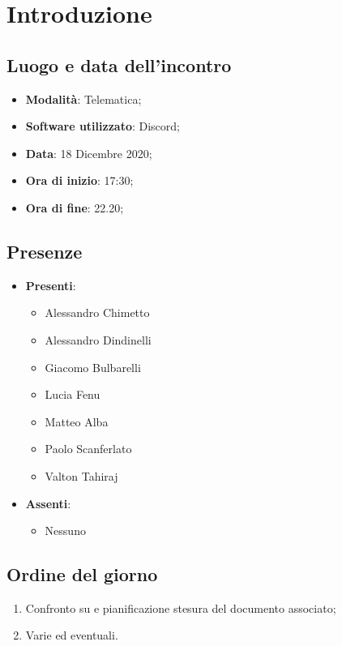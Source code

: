 \documentclass[]{article}
\begin{document}
	
	
	
	\newpage
	
	\section{Introduzione}
		\subsection{Luogo e data dell'incontro}
		\begin{itemize}
			\item \textbf{Modalità}: Telematica;
			\item \textbf{Software utilizzato}: Discord;
			\item \textbf{Data}: 18 Dicembre 2020;
			\item \textbf{Ora di inizio}: 17:30;
			\item \textbf{Ora di fine}: 22.20;
		\end{itemize}

		\subsection{Presenze}
		\begin{itemize}
			\item \textbf{Presenti}:
			\begin{itemize}
				\item Alessandro Chimetto
				\item Alessandro Dindinelli
				\item Giacomo Bulbarelli
				\item Lucia Fenu
				\item Matteo Alba
				\item Paolo Scanferlato
				\item Valton Tahiraj
			\end{itemize}
			\item \textbf{Assenti}:
			\begin{itemize}
				\item Nessuno
			\end{itemize}
		\end{itemize}


		\subsection{Ordine del giorno}
		\begin{enumerate}
			\item Confronto su  e pianificazione stesura del documento associato;
			\item Varie ed eventuali.
		\end{enumerate}
\end{document}
